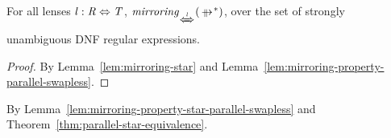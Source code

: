 \documentclass[numbers,10pt,preprint\ifanon ,nocopyrightspace\fi]{sigplanconf}
\begin{document}
\begin{lemma}
  \label{lem:mirroring-property-star-parallel-swapless}
  For all lenses $\mathit{l} : \mathit{R} \Leftrightarrow \mathit{T}$,
  $\IsMirroringWithPropertyOf{\StarOf{\ParallelRewrite}}{\DNFLensHasSemanticsOf{\Lens}}$,
  over the set of strongly unambiguous DNF regular expressions.
\end{lemma}
\begin{proof}
  By Lemma~\ref{lem:mirroring-star} and
  Lemma~\ref{lem:mirroring-property-parallel-swapless}.
\end{proof}

\begin{corollary}
  \label{cor:mirroring-star-sequential}
  By Lemma~\ref{lem:mirroring-property-star-parallel-swapless} and
  Theorem~\ref{thm:parallel-star-equivalence}.
\end{corollary}
\end{document}

